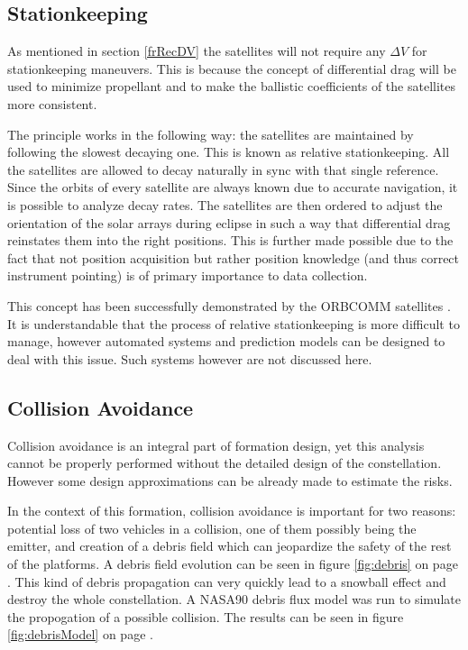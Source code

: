 \subsection{Stationkeeping}
\label{frSSStation}

As mentioned in section \ref{frRecDV} the satellites will not require any $\Delta V$ for stationkeeping maneuvers. This is because the concept of differential drag will be used to minimize propellant and to make the ballistic coefficients of the satellites more consistent.

The principle works in the following way: the satellites are maintained by following the slowest decaying one. This is known as relative stationkeeping. All the satellites are allowed to decay naturally in sync with that single reference. Since the orbits of every satellite are always known due to accurate navigation, it is possible to analyze decay rates. The satellites are then ordered to adjust the orientation of the solar arrays during eclipse in such a way that differential drag reinstates them into the right positions. This is further made possible due to the fact that not position acquisition but rather position knowledge (and thus correct instrument pointing) is of primary importance to data collection.

This concept has been successfully demonstrated by the ORBCOMM satellites \cite{constDesign}. It is understandable that the process of relative stationkeeping is more difficult to manage, however automated systems and prediction models can be designed to deal with this issue. Such systems however are not discussed here.  

\subsection{Collision Avoidance}
\label{frSSCA}

Collision avoidance is an integral part of formation design, yet this analysis cannot be properly performed without the detailed design of the constellation. However some design approximations can be already made to estimate the risks.

In the context of this formation, collision avoidance is important for two reasons: potential loss of two vehicles in a collision, one of them possibly being the emitter, and creation of a debris field which can jeopardize the safety of the rest of the platforms. A debris field evolution can be seen in figure \ref{fig:debris} on page \pageref{fig:debris}. This kind of debris propagation can very quickly lead to a snowball effect and destroy the whole constellation. A NASA90 debris flux model was run to simulate the propogation of a possible collision. The results can be seen in figure \ref{fig:debrisModel} on page \pageref{fig:debrisModel}. 


